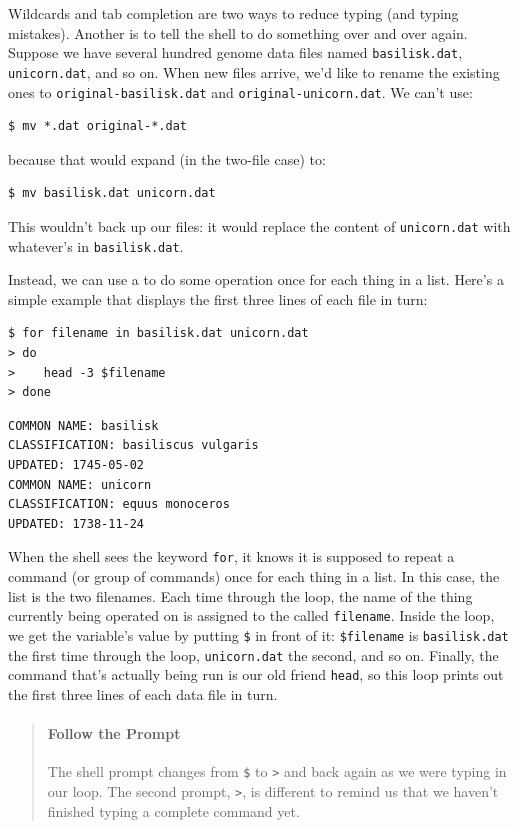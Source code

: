 \documentclass{book}
\begin{document}
Wildcards and tab completion are two ways to reduce typing (and typing
mistakes). Another is to tell the shell to do something over and over
again. Suppose we have several hundred genome data files named
\texttt{basilisk.dat}, \texttt{unicorn.dat}, and so on. When new files
arrive, we'd like to rename the existing ones to
\texttt{original-basilisk.dat} and \texttt{original-unicorn.dat}. We
can't use:

\begin{verbatim}
$ mv *.dat original-*.dat
\end{verbatim}

because that would expand (in the two-file case) to:

\begin{verbatim}
$ mv basilisk.dat unicorn.dat
\end{verbatim}

This wouldn't back up our files: it would replace the content of
\texttt{unicorn.dat} with whatever's in \texttt{basilisk.dat}.

Instead, we can use a  to do some operation
once for each thing in a list. Here's a simple example that displays the
first three lines of each file in turn:

\begin{verbatim}
$ for filename in basilisk.dat unicorn.dat
> do
>    head -3 $filename
> done
\end{verbatim}

\begin{verbatim}
COMMON NAME: basilisk
CLASSIFICATION: basiliscus vulgaris
UPDATED: 1745-05-02
COMMON NAME: unicorn
CLASSIFICATION: equus monoceros
UPDATED: 1738-11-24
\end{verbatim}

When the shell sees the keyword \texttt{for}, it knows it is supposed to
repeat a command (or group of commands) once for each thing in a list.
In this case, the list is the two filenames. Each time through the loop,
the name of the thing currently being operated on is assigned to the
 called \texttt{filename}. Inside the
loop, we get the variable's value by putting \texttt{\$} in front of it:
\texttt{\$filename} is \texttt{basilisk.dat} the first time through the
loop, \texttt{unicorn.dat} the second, and so on. Finally, the command
that's actually being run is our old friend \texttt{head}, so this loop
prints out the first three lines of each data file in turn.

\begin{quote}
\mbox{}\paragraph{Follow the Prompt}

The shell prompt changes from \texttt{\$} to \texttt{\textgreater{}} and
back again as we were typing in our loop. The second prompt,
\texttt{\textgreater{}}, is different to remind us that we haven't
finished typing a complete command yet.
\end{quote}
\end{document}
